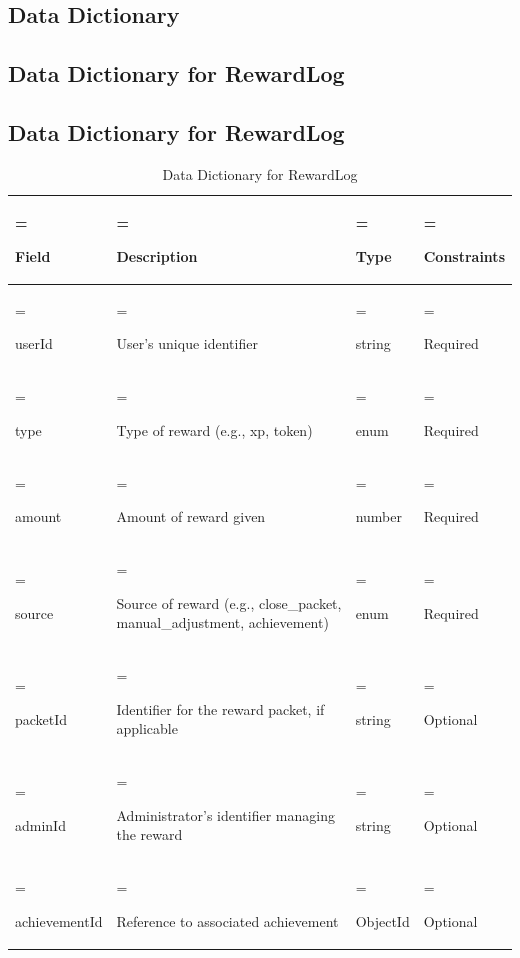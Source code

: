 \subsection{Data Dictionary}
\subsection{Data Dictionary for RewardLog}

\subsection{Data Dictionary for RewardLog}
\begin{table}[H]
    \renewcommand{\arraystretch}{1.5} %
    \centering
    \caption{Data Dictionary for RewardLog}
    \medskip
    \begin{tabularx}{\textwidth} {
            | >{\hsize=0.8\hsize\linewidth=\hsize\raggedright\arraybackslash}X
            | >{\hsize=1.7\hsize\linewidth=\hsize\raggedright\arraybackslash}X
            | >{\hsize=0.6\hsize\linewidth=\hsize\raggedright\arraybackslash}X
            | >{\hsize=0.9\hsize\linewidth=\hsize\raggedright\arraybackslash}X |}
        \hline
        \rowcolor{primary} \textbf{Field} & \textbf{Description} & \textbf{Type} & \textbf{Constraints} \\
        \hline
        userId & User's unique identifier & string & Required \\
        \hline
        type & Type of reward (e.g., xp, token) & enum & Required \\
        \hline
        amount & Amount of reward given & number & Required \\
        \hline
        source & Source of reward (e.g., close\_packet, manual\_adjustment, achievement) & enum & Required \\
        \hline
        packetId & Identifier for the reward packet, if applicable & string & Optional \\
        \hline
        adminId & Administrator's identifier managing the reward & string & Optional \\
        \hline
        achievementId & Reference to associated achievement & ObjectId & Optional \\
        \hline
    \end{tabularx}
\end{table}

